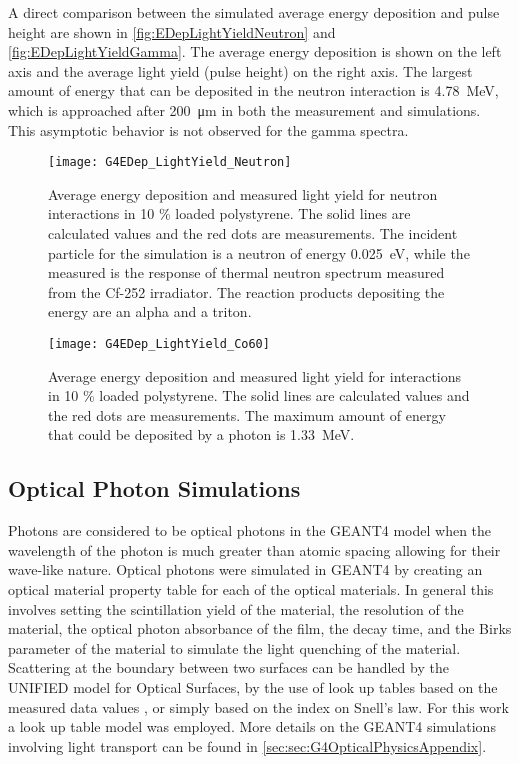 A direct comparison between the simulated average energy deposition and pulse height are shown in \autoref{fig:EDepLightYieldNeutron} and \autoref{fig:EDepLightYieldGamma}. 
The average energy deposition is shown on the left axis and the average light yield (pulse height) on the right axis.
The largest amount of energy that can be deposited in the neutron interaction is \SI{4.78}{\MeV}, which is approached after \SI{200}{\um} in both the measurement and simulations.
This asymptotic behavior is not observed for the gamma spectra.
\begin{figure}
	\centering
    	\texttt{[image: G4EDep\_LightYield\_Neutron]}
	\caption[Average Light Yield and Energy Deposition for neutron interactions in PS]{Average energy deposition and measured light yield for neutron interactions in 10 \% loaded polystyrene. The solid lines are calculated values and the red dots are measurements. The incident particle for the simulation is a neutron of energy \SI{0.025}{\eV}, while the measured is the response of thermal neutron spectrum measured from the Cf-252 irradiator. The reaction products depositing the energy are an alpha and a triton.}
	\label{fig:EDepLightYieldNeutron}
\end{figure}
\begin{figure}
	\centering
    	\texttt{[image: G4EDep\_LightYield\_Co60]}
	\caption[Average Light Yield and Energy Deposition for Gamma interactions in PS]{Average energy deposition and measured light yield for  interactions in 10 \% loaded polystyrene. The solid lines are calculated values and the red dots are measurements. The maximum amount of energy that could be deposited by a  photon is \SI{1.33}{\MeV}.}
	\label{fig:EDepLightYieldGamma}
\end{figure}

\subsection{Optical Photon Simulations}
\label{sec:OpticalPhotonSims}
Photons are considered to be optical photons in the GEANT4 model when the wavelength of the photon is much greater than atomic spacing allowing for their wave-like nature.
Optical photons were simulated in GEANT4 by creating an optical material property table for each of the optical materials.
In general this involves setting the scintillation yield of the material, the resolution of the material, the optical photon absorbance of the film, the decay time, and the Birks parameter of the material to simulate the light quenching of the material.
Scattering at the boundary between two surfaces can be  handled by the UNIFIED model for Optical Surfaces, by the use of look up tables based on the measured data values \cite{5485130}, or simply based on the index on Snell's law.
For this work a look up table model was employed. More details on the GEANT4 simulations involving light transport can be found in \autoref{sec:sec:G4OpticalPhysicsAppendix}.


